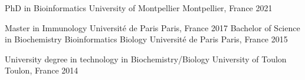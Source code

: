 
\begin{cvhonors}
  \cvhonor
    {PhD in Bioinformatics} %
    {University of Montpellier} %
    {Montpellier, France} %
    {2021} %

  \cvhonor
    {Master in Immunology} %
    {Université de Paris} %
    {Paris, France} %
    {2017} %
  \cvhonor
    {Bachelor of Science in Biochemistry Bioinformatics Biology} %
    {Université de Paris} %
    {Paris, France} %
    {2015} %

  \cvhonor
    {University degree in technology in Biochemistry/Biology} %
    {University of Toulon} %
    {Toulon, France} %
    {2014} %

\end{cvhonors}
